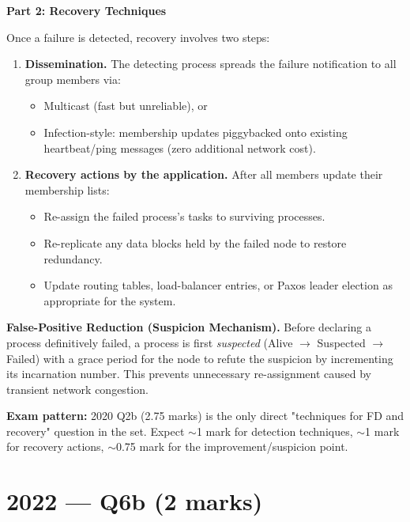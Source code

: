 \documentclass[12pt,a4paper]{article}
\begin{document}
\begin{solbox}
\medskip
\textbf{Part 2: Recovery Techniques}

Once a failure is detected, recovery involves two steps:

\begin{enumerate}
  \item \textbf{Dissemination.}
        The detecting process spreads the failure notification to all group members via:
        \begin{itemize}
          \item Multicast (fast but unreliable), or
          \item Infection-style: membership updates piggybacked onto existing heartbeat/ping
                messages (zero additional network cost).
        \end{itemize}

  \item \textbf{Recovery actions by the application.}
        After all members update their membership lists:
        \begin{itemize}
          \item Re-assign the failed process's tasks to surviving processes.
          \item Re-replicate any data blocks held by the failed node to restore redundancy.
          \item Update routing tables, load-balancer entries, or Paxos leader election
                as appropriate for the system.
        \end{itemize}
\end{enumerate}

\medskip
\textbf{False-Positive Reduction (Suspicion Mechanism).}
Before declaring a process definitively failed, a process is first \emph{suspected}
(Alive $\to$ Suspected $\to$ Failed) with a grace period for the node to refute the
suspicion by incrementing its incarnation number.
This prevents unnecessary re-assignment caused by transient network congestion.
\end{solbox}

\begin{notesbox}
\textbf{Exam pattern:} 2020 Q2b (2.75 marks) is the only direct "techniques for FD
and recovery" question in the set. Expect $\sim$1 mark for detection techniques,
$\sim$1 mark for recovery actions, $\sim$0.75 mark for the improvement/suspicion point.
\end{notesbox}

\newpage
\section{2022 — Q6b (2 marks)}
\end{document}

